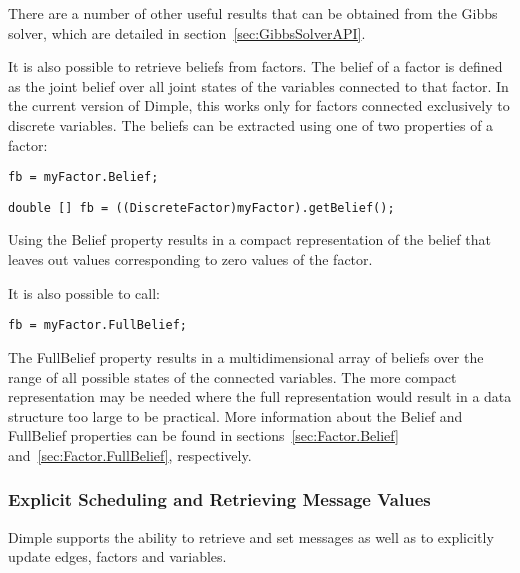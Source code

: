 There are a number of other useful results that can be obtained from the Gibbs solver, which are detailed in section~\ref{sec:GibbsSolverAPI}.

It is also possible to retrieve beliefs from factors.  The belief of a factor is defined as the joint belief over all joint states of the variables connected to that factor.  In the current version of Dimple, this works only for factors connected exclusively to discrete variables.  The beliefs can be extracted using one of two properties of a factor:

\ifmatlab
\begin{lstlisting}
fb = myFactor.Belief;
\end{lstlisting}
\fi



\ifjava
\begin{lstlisting}
double [] fb = ((DiscreteFactor)myFactor).getBelief();
\end{lstlisting}

\fi

Using the Belief property results in a compact representation of the belief that leaves out values corresponding to zero values of the factor.  

\ifmatlab

It is also possible to call:

\begin{lstlisting}
fb = myFactor.FullBelief;
\end{lstlisting}

The FullBelief property results in a multidimensional array of beliefs over the range of all possible states of the connected variables.  The more compact representation may be needed where the full representation would result in a data structure too large to be practical.  More information about the Belief and FullBelief properties can be found in sections~\ref{sec:Factor.Belief} and~\ref{sec:Factor.FullBelief}, respectively.
\fi
 
\subsubsection{Explicit Scheduling and Retrieving Message Values}

Dimple supports the ability to retrieve and set messages as well as to explicitly update edges, factors and variables.

